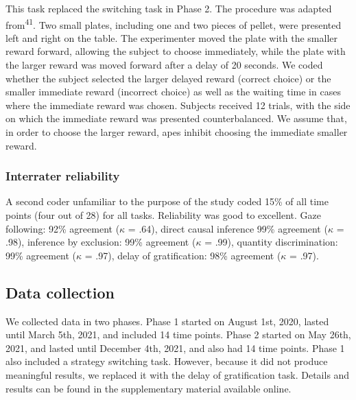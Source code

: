\documentclass[
  man,floatsintext]{apa6}
\begin{document}
This task replaced the switching task in Phase 2. The procedure was adapted from\textsuperscript{41}. Two small plates, including one and two pieces of pellet, were presented left and right on the table. The experimenter moved the plate with the smaller reward forward, allowing the subject to choose immediately, while the plate with the larger reward was moved forward after a delay of 20 seconds. We coded whether the subject selected the larger delayed reward (correct choice) or the smaller immediate reward (incorrect choice) as well as the waiting time in cases where the immediate reward was chosen. Subjects received 12 trials, with the side on which the immediate reward was presented counterbalanced. We assume that, in order to choose the larger reward, apes inhibit choosing the immediate smaller reward.

\hypertarget{interrater-reliability}{%
\subsubsection{Interrater reliability}\label{interrater-reliability}}

A second coder unfamiliar to the purpose of the study coded 15\% of all time points (four out of 28) for all tasks. Reliability was good to excellent. Gaze following: 92\% agreement (\(\kappa\) = .64), direct causal inference 99\% agreement (\(\kappa\) = .98), inference by exclusion: 99\% agreement (\(\kappa\) = .99), quantity discrimination: 99\% agreement (\(\kappa\) = .97), delay of gratification: 98\% agreement (\(\kappa\) = .97).

\hypertarget{data-collection}{%
\subsection{Data collection}\label{data-collection}}

We collected data in two phases. Phase 1 started on August 1st, 2020, lasted until March 5th, 2021, and included 14 time points. Phase 2 started on May 26th, 2021, and lasted until December 4th, 2021, and also had 14 time points. Phase 1 also included a strategy switching task. However, because it did not produce meaningful results, we replaced it with the delay of gratification task. Details and results can be found in the supplementary material available online.
\end{document}
